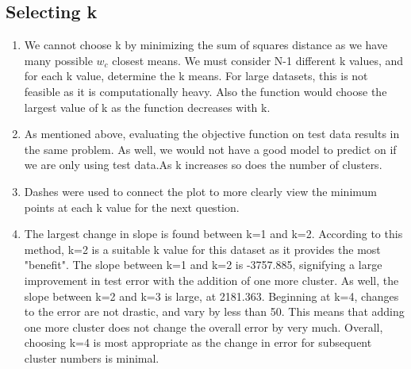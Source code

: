 \documentclass{article}
\begin{document}
\subsection{Selecting k}
\begin{enumerate}
\item We cannot choose k by minimizing the sum of squares distance as we have many possible ${w_c}$ closest means. We must consider N-1 different k values, and for each k value, determine the k means. For large datasets, this is not feasible as it is computationally heavy. Also the function would choose the largest value of k as the function decreases with k.
\item As mentioned above, evaluating the objective function on test data results in the same problem. As well, we would not have a good model to predict on if we are only using test data.As k increases so does the number of clusters.
\item {} Dashes were used to connect the plot to more clearly view the minimum points at each k value for the next question. 
\item The largest change in slope is found between k=1 and k=2. According to this method, k=2 is a suitable k value for this dataset as it provides the most "benefit". The slope between k=1 and k=2 is -3757.885, signifying a large improvement in test error with the addition of one more cluster. As well, the slope between k=2 and k=3 is large, at 2181.363. Beginning at k=4, changes to the error are not drastic, and vary by less than 50. This means that adding one more cluster does not change the overall error by very much. Overall, choosing k=4 is most appropriate as the change in error for subsequent cluster numbers is minimal. 
\end{enumerate}
\end{document}
